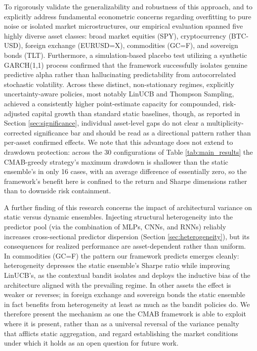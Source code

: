\documentclass[pdflatex,sn-mathphys-num]{sn-jnl}
\theoremstyle{thmstyleone}%
\theoremstyle{thmstyletwo}%
\theoremstyle{thmstylethree}%
\begin{document}
To rigorously validate the generalizability and robustness of this approach, and to explicitly address fundamental econometric concerns regarding overfitting to pure noise or isolated market microstructures, our empirical evaluation spanned five highly diverse asset classes: broad market equities (SPY), cryptocurrency (BTC-USD), foreign exchange (EURUSD=X), commodities (GC=F), and sovereign bonds (TLT). Furthermore, a simulation-based placebo test utilizing a synthetic GARCH(1,1) process confirmed that the framework successfully isolates genuine predictive alpha rather than hallucinating predictability from autocorrelated stochastic volatility. Across these distinct, non-stationary regimes, explicitly uncertainty-aware policies, most notably LinUCB and Thompson Sampling, achieved a consistently higher point-estimate capacity for compounded, risk-adjusted capital growth than standard static baselines, though, as reported in Section \ref{sec:significance}, individual asset-level gaps do not clear a multiplicity-corrected significance bar and should be read as a directional pattern rather than per-asset confirmed effects. We note that this advantage does not extend to drawdown protection: across the 30 configurations of Table \ref{tab:main_results} the CMAB-greedy strategy's maximum drawdown is shallower than the static ensemble's in only 16 cases, with an average difference of essentially zero, so the framework's benefit here is confined to the return and Sharpe dimensions rather than to downside risk containment.

A further finding of this research concerns the impact of architectural variance on static versus dynamic ensembles. Injecting structural heterogeneity into the predictor pool (via the combination of MLPs, CNNs, and RNNs) reliably increases cross-sectional predictor dispersion (Section \ref{sec:heterogeneity}), but its consequences for realized performance are asset-dependent rather than uniform. In commodities (GC=F) the pattern our framework predicts emerges cleanly: heterogeneity depresses the static ensemble's Sharpe ratio while improving LinUCB's, as the contextual bandit isolates and deploys the inductive bias of the architecture aligned with the prevailing regime. In other assets the effect is weaker or reverses; in foreign exchange and sovereign bonds the static ensemble in fact benefits from heterogeneity at least as much as the bandit policies do. We therefore present the mechanism as one the CMAB framework is able to exploit where it is present, rather than as a universal reversal of the variance penalty that afflicts static aggregation, and regard establishing the market conditions under which it holds as an open question for future work.
\end{document}
